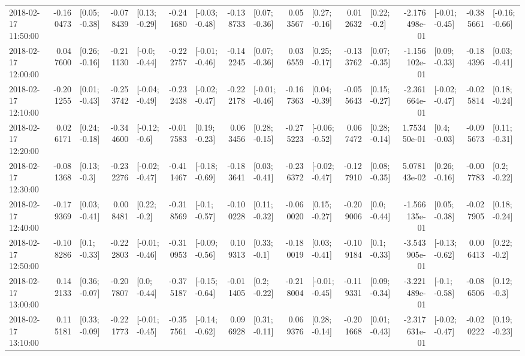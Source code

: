 \begin{tabular}{lrlrlrlrlrlrlrlrl}
2018-02-17 11:50:00 & -0.160473 &   [0.05; -0.38] & -0.078439 &   [0.13; -0.29] & -0.241680 &  [-0.03; -0.48] & -0.138733 &   [0.07; -0.36] &  0.053567 &   [0.27; -0.16] &  0.012632 &    [0.22; -0.2] & -2.176498e-01 &  [-0.01; -0.45] & -0.385661 &  [-0.16; -0.66] \\
2018-02-17 12:00:00 &  0.047600 &   [0.26; -0.16] & -0.211130 &   [-0.0; -0.44] & -0.222757 &  [-0.01; -0.46] & -0.142245 &   [0.07; -0.36] &  0.036559 &   [0.25; -0.17] & -0.133762 &   [0.07; -0.35] & -1.156102e-01 &   [0.09; -0.33] & -0.184396 &   [0.03; -0.41] \\
2018-02-17 12:10:00 & -0.201255 &   [0.01; -0.43] & -0.253742 &  [-0.04; -0.49] & -0.232438 &  [-0.02; -0.47] & -0.222178 &  [-0.01; -0.46] & -0.167363 &   [0.04; -0.39] & -0.055643 &   [0.15; -0.27] & -2.361664e-01 &  [-0.02; -0.47] & -0.025814 &   [0.18; -0.24] \\
2018-02-17 12:20:00 &  0.026171 &   [0.24; -0.18] & -0.344600 &   [-0.12; -0.6] & -0.017583 &   [0.19; -0.23] &  0.063456 &   [0.28; -0.15] & -0.275223 &  [-0.06; -0.52] &  0.067472 &   [0.28; -0.14] &  1.753450e-01 &    [0.4; -0.03] & -0.095673 &   [0.11; -0.31] \\
2018-02-17 12:30:00 & -0.081368 &    [0.13; -0.3] & -0.232276 &  [-0.02; -0.47] & -0.411467 &  [-0.18; -0.69] & -0.183641 &   [0.03; -0.41] & -0.236372 &  [-0.02; -0.47] & -0.127910 &   [0.08; -0.35] &  5.078143e-02 &   [0.26; -0.16] & -0.007783 &    [0.2; -0.22] \\
2018-02-17 12:40:00 & -0.179369 &   [0.03; -0.41] &  0.008481 &    [0.22; -0.2] & -0.318569 &   [-0.1; -0.57] & -0.100228 &   [0.11; -0.32] & -0.060020 &   [0.15; -0.27] & -0.209006 &    [0.0; -0.44] & -1.566135e-01 &   [0.05; -0.38] & -0.027905 &   [0.18; -0.24] \\
2018-02-17 12:50:00 & -0.108286 &    [0.1; -0.33] & -0.222803 &  [-0.01; -0.46] & -0.310953 &  [-0.09; -0.56] &  0.109313 &    [0.33; -0.1] & -0.180019 &   [0.03; -0.41] & -0.109184 &    [0.1; -0.33] & -3.543905e-01 &  [-0.13; -0.62] &  0.006413 &    [0.22; -0.2] \\
2018-02-17 13:00:00 &  0.142133 &   [0.36; -0.07] & -0.207807 &    [0.0; -0.44] & -0.375187 &  [-0.15; -0.64] & -0.011405 &    [0.2; -0.22] & -0.218004 &  [-0.01; -0.45] & -0.119331 &   [0.09; -0.34] & -3.221489e-01 &   [-0.1; -0.58] & -0.086506 &    [0.12; -0.3] \\
2018-02-17 13:10:00 &  0.115181 &   [0.33; -0.09] & -0.221773 &  [-0.01; -0.45] & -0.357561 &  [-0.14; -0.62] &  0.096928 &   [0.31; -0.11] &  0.069376 &   [0.28; -0.14] & -0.201668 &   [0.01; -0.43] & -2.317631e-01 &  [-0.02; -0.47] & -0.020222 &   [0.19; -0.23] \\

\end{tabular}
